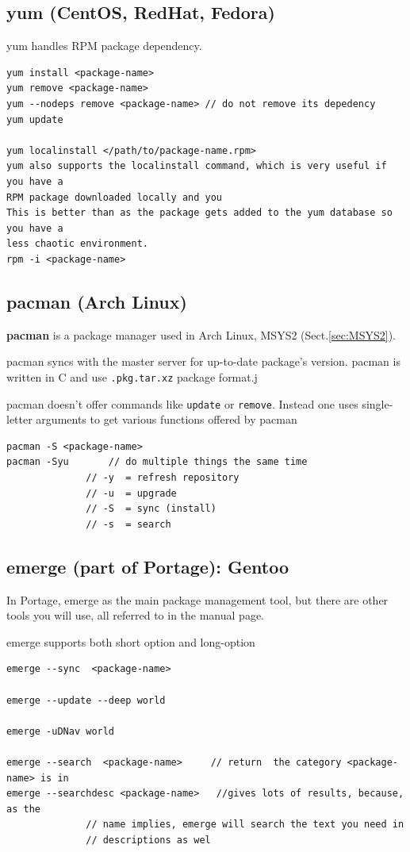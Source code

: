 \subsection{yum (CentOS, RedHat, Fedora)}
\label{sec:yum}

yum handles RPM package dependency. 
\begin{verbatim}
yum install <package-name>
yum remove <package-name>
yum --nodeps remove <package-name> // do not remove its depedency
yum update

yum localinstall </path/to/package-name.rpm>
yum also supports the localinstall command, which is very useful if you have a
RPM package downloaded locally and you 
This is better than as the package gets added to the yum database so you have a
less chaotic environment.
rpm -i <package-name>
\end{verbatim}

\subsection{pacman (Arch Linux)}
\label{sec:pacman}

{\bf pacman}  is a package manager used in Arch Linux, MSYS2
(Sect.\ref{sec:MSYS2}).

pacman syncs with the master server for up-to-date package's version.
pacman is written in C and use \verb!.pkg.tar.xz! package format.j

pacman doesn't offer commands like \verb!update! or \verb!remove!. Instead one
uses single-letter arguments to get various functions offered by pacman 

\begin{verbatim}
pacman -S <package-name>
pacman -Syu       // do multiple things the same time
              // -y  = refresh repository
              // -u  = upgrade
              // -S  = sync (install)
              // -s  = search
\end{verbatim}

\subsection{emerge (part of Portage): Gentoo}
\label{sec:emerge}

In Portage, emerge as the main package management tool, but there are other
tools you will use, all referred to in the manual page.

emerge supports both short option and long-option
\begin{verbatim}
emerge --sync  <package-name>

emerge --update --deep world 

emerge -uDNav world

emerge --search  <package-name>     // return  the category <package-name> is in 
emerge --searchdesc <package-name>   //gives lots of results, because, as the
              // name implies, emerge will search the text you need in
              // descriptions as wel
\end{verbatim}


